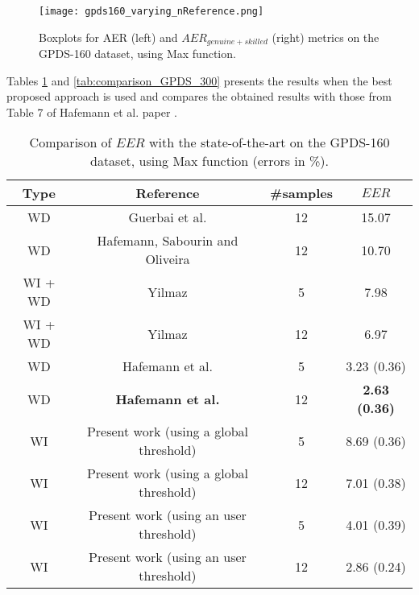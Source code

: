 \documentclass[conference]{IEEEtran}
\begin{document}
\begin{figure}[!htb]
\centering
  \texttt{[image: gpds160\_varying\_nReference.png]}
  \caption{Boxplots for AER (left) and $AER_{genuine+skilled}$ (right) metrics on the GPDS-160 dataset, using Max function.}
  \label{fig:gpds160_varying_nReference}
\end{figure}

Tables \ref{tab:comparison_GPDS_160} and \ref{tab:comparison_GPDS_300} presents the results when the best proposed approach is used and compares the obtained results with those from Table 7 of Hafemann et al. paper \cite{hafemann:17}.


\begin{table}[!htb]
\caption{Comparison of $EER$ with the state-of-the-art on the GPDS-160 dataset, using Max function (errors in \%).}
\label{tab:comparison_GPDS_160}
\scriptsize
\centering

\begin{tabular}{cccc}
\hline
Type & Reference & \#samples & $EER$ \\ 
\hline
WD & Guerbai et al. \cite{guerbai:15} & 12  &  15.07 \\ 
WD & Hafemann, Sabourin and Oliveira \cite{hafemann:16} & 12  & 10.70 \\ 
WI + WD & Yilmaz \cite{yilmaz:16} & 5  &  7.98 \\ 
WI + WD & Yilmaz \cite{yilmaz:16} & 12  &  6.97 \\
WD & Hafemann et al. \cite{hafemann:17} & 5 &  3.23 (0.36) \\ 
WD & \textbf{Hafemann et al. \cite{hafemann:17}} & 12  &  \textbf{2.63 (0.36)} \\ 
WI & Present work (using a global threshold) & 5 & 8.69 (0.36) \\ 
WI & Present work (using a global threshold) & 12  & 7.01 (0.38) \\
WI & Present work (using an user threshold) & 5 & 4.01 (0.39) \\ 
WI & Present work (using an user threshold) & 12  & 2.86 (0.24) \\ 
\hline

\end{tabular}
\end{table}
\end{document}

